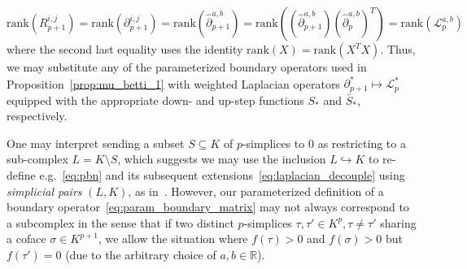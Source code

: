\begin{equation}
	\mathrm{rank}(R_{p+1}^{i,j}) = \mathrm{rank}(\partial_{p+1}^{i, j}) = \mathrm{rank}(\hat{\partial}_{p+1}^{a,b}) = \mathrm{rank}\left((\hat{\partial}_{p+1}^{a,b})(\hat{\partial}_p^{a,b})^T \right) = \mathrm{rank}(\mathcal{L}_{p}^{a,b})
\end{equation}
where the second last equality uses the identity $\mathrm{rank}(X) = \mathrm{rank}(X^T X)$. Thus, we may substitute any of the parameterized boundary operators used in Proposition~\ref{prop:mu_betti_1}  with weighted Laplacian operators $\partial_{p+1}^\ast \mapsto \mathcal{L}_p^\ast$ equipped with the appropriate down- and up-step functions $S_\ast$ and $\bar{S}_\ast$, respectively.   


\begin{remark}
One may interpret sending a subset $S \subseteq K$ of $p$-simplices to $0$ as restricting to a sub-complex $L = K \setminus S$, which suggests we may use the inclusion $L \hookrightarrow K$ to re-define e.g.~\eqref{eq:pbn} and its subsequent extensions~\eqref{eq:laplacian_decouple} using \emph{simplicial pairs} $(L, K)$, as in~\cite{memoli2022persistent}. However, our parameterized definition of a boundary operator~\eqref{eq:param_boundary_matrix} may not always correspond to a subcomplex in the sense that if two distinct $p$-simplices $\tau, \tau' \in K^p, \tau \neq \tau'$ sharing a coface $\sigma \in K^{p+1}$, we allow the situation where $f(\tau) > 0$ and $f(\sigma) > 0$ but $f(\tau') = 0$ (due to the arbitrary choice of $a, b \in \mathbb{R}$). 
\end{remark}

